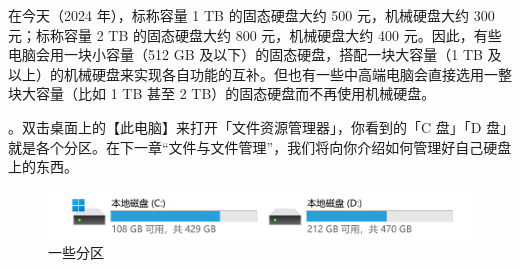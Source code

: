 在今天（2024 年），标称容量 1 TB 的固态硬盘大约 500 元，机械硬盘大约 300 元；标称容量 2 TB 的固态硬盘大约 800 元，机械硬盘大约 400 元。因此，有些电脑会用一块小容量（512 GB 及以下）的固态硬盘，搭配一块大容量（1 TB 及以上）的机械硬盘来实现各自功能的互补。但也有一些中高端电脑会直接选用一整块大容量（比如 1 TB 甚至 2 TB）的固态硬盘而不再使用机械硬盘。

。双击桌面上的【此电脑】来打开「文件资源管理器」，你看到的「C 盘」「D 盘」就是各个分区。在下一章“文件与文件管理”，我们将向你介绍如何管理好自己硬盘上的东西。 

\begin{figure}[htb!]
  \centering
  \includegraphics[width=.8\textwidth]{assets/basic/Partitions.png}
  \caption{一些分区}
  \label{fig:partitions}
\end{figure}

